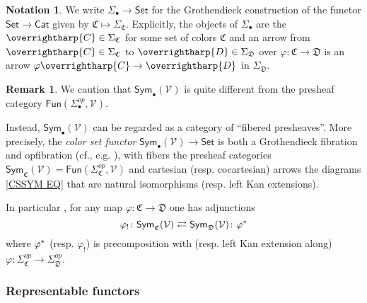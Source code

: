 \documentclass[a4paper,10pt
 ,final
]{article}%
\numberwithin{equation}{section}
\numberwithin{figure}{section}
\theoremstyle{definition} %
\newtheorem{remark}[equation]{Remark}%
\newtheorem{notation}[equation]{Notation}%
\newcommand{\vect}[1]{\text{\overrightharp{\ensuremath{#1}}}}
\newcommand{\Sym}{\ensuremath{\mathsf{Sym}}}%
\newcommand{\V}{\ensuremath{\mathcal V}}
\newcommand{\1}{\ensuremath{\mathbbm 1}}%
\begin{document}
\begin{notation}\label{SIGMABULL NOT}
	We write
	$\Sigma_{\bullet} \to \mathsf{Set}$
	for the Grothendieck construction 
	\cite[Not. \ref{OC-GROTHCONS NOT}]{BP_FCOP}
	of the functor
	$\mathsf{Set} \to \mathsf{Cat}$ given by
	$\mathfrak{C} \mapsto \Sigma_{\mathfrak{C}}$.
%	
	Explicitly, 
	the objects of $\Sigma_{\bullet}$
	are the $\vect{C} \in \Sigma_{\mathfrak{C}}$ 
	for some set of colors $\mathfrak{C}$
	and an arrow from
	$\vect{C} \in \Sigma_{\mathfrak{C}}$ to
	$\vect{D} \in \Sigma_{\mathfrak{D}}$
	over $\varphi \colon \mathfrak{C} \to \mathfrak{D}$
	is an arrow
	$\varphi \vect{C} \to \vect{D}$ in $\Sigma_{\mathfrak{D}}$.
\end{notation}



\begin{remark}\label{COLCHADJ REM}
	We caution that 
	$\mathsf{Sym}_{\bullet}(\V)$
	is quite different from the presheaf category 
	$\mathsf{Fun}(\Sigma_{\bullet}^{op},\V)$.
	
	Instead,  
	$\mathsf{Sym}_{\bullet}(\V)$
	can be regarded as a category of ``fibered presheaves''.
	More precisely, 
	the \emph{color set functor}
	$\mathsf{Sym}_{\bullet}(\V) \to \mathsf{Set}$
	is both a Grothendieck fibration
	and opfibration
	(cf., e.g. \cite[\S \ref{OC-GROTFIB SEC}]{BP_FCOP}),
	with fibers the 
	presheaf categories
	$\Sym_{\mathfrak C}(\V)=
	\mathsf{Fun}(\Sigma_{\mathfrak{C}}^{op},\mathcal{V})$
	and cartesian (resp. cocartesian)
	arrows the diagrams \eqref{CSSYM EQ}
	that are natural isomorphisms (resp. left Kan extensions).

	In particular \cite[Rem. \ref{OC-ALSOOPADJ REM}]{BP_FCOP},
	for any map $\varphi \colon \mathfrak{C} \to \mathfrak{D}$
	one has adjunctions
	\begin{equation}\label{COLCHADJ EQ}
	\varphi_! \colon \Sym_{\mathfrak C}(\V) 
	\rightleftarrows 
	\Sym_{\mathfrak D}(\V) \colon \varphi^{\**}
	\end{equation}
	where $\varphi^{\**}$
	(resp. $\varphi_!$)
	is precomposition with (resp. left Kan extension along)
	$\varphi\colon 
	\Sigma^{op}_{\mathfrak{C}}
	\to 
	\Sigma^{op}_{\mathfrak{D}}$.
\end{remark}




\subsubsection*{Representable functors}
\end{document}
